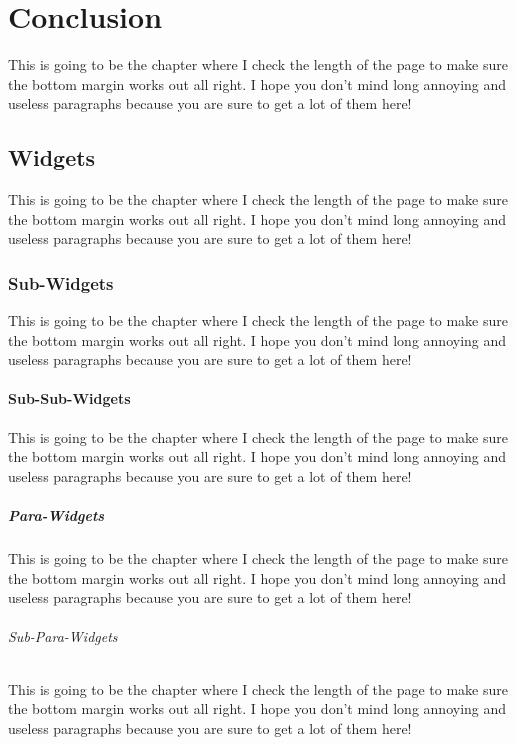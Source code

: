 \chapter{Conclusion}

This is going to be the chapter where I check the length of the page to make
sure the bottom margin works out all right.  I hope you don't mind long
annoying and useless paragraphs because you are sure to get a lot of them here!

\section{Widgets}

This is going to be the chapter where I check the length of the page
to make sure the bottom margin works out all right.  I hope you don't
mind long annoying and useless paragraphs because you are sure to get
a lot of them here!

\subsection{Sub-Widgets}

This is going to be the chapter where I check the length of the page
to make sure the bottom margin works out all right.  I hope you don't
mind long annoying and useless paragraphs because you are sure to get
a lot of them here!

\subsubsection{Sub-Sub-Widgets}

This is going to be the chapter where I check the length of the page
to make sure the bottom margin works out all right.  I hope you don't
mind long annoying and useless paragraphs because you are sure to get
a lot of them here!

\paragraph{Para-Widgets}

This is going to be the chapter where I check the length of the page
to make sure the bottom margin works out all right.  I hope you don't
mind long annoying and useless paragraphs because you are sure to get
a lot of them here!

\subparagraph{Sub-Para-Widgets}

This is going to be the chapter where I check the length of the page
to make sure the bottom margin works out all right.  I hope you don't
mind long annoying and useless paragraphs because you are sure to get
a lot of them here!

